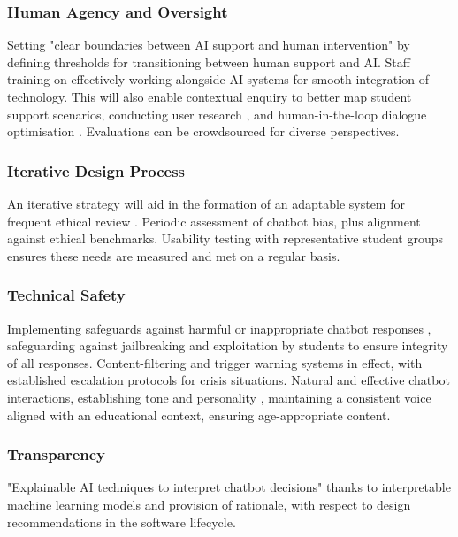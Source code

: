 \documentclass[14pt,a4paper]{article}
\begin{document}
\begin{multicols}{2}
\subsubsection{Human Agency and Oversight}

Setting "clear boundaries between AI support and human intervention" \textit{\parencite{APA2024}}by defining thresholds for transitioning between human support and AI. Staff training on effectively working alongside AI systems for smooth integration of technology. This will also enable contextual enquiry to better map student support scenarios, conducting user research \textit{\parencite[pp. 50-100]{Goodman2023}}, and human-in-the-loop dialogue optimisation \textit{\parencite[pp. 30-60]{Vaughan2024}}. Evaluations can be crowdsourced for diverse perspectives.

\subsubsection{Iterative Design Process}
An iterative strategy \textit{\parencite[pp. 30-60]{HoltzblattBeyer2024}} will aid in the formation of an adaptable system for frequent ethical review \textit{\parencite{FloridiCowls2023}}. Periodic assessment of chatbot bias, plus alignment against ethical benchmarks. Usability testing with representative student groups ensures these needs are measured and met on a regular basis.

\subsubsection{Technical Safety}
Implementing safeguards against harmful or inappropriate chatbot responses \textit{\parencite[p. e11510]{Bickmore2021}}, safeguarding against jailbreaking and exploitation by students to ensure integrity of all responses. Content-filtering and trigger warning systems in effect, with established escalation protocols for crisis situations. Natural and effective chatbot interactions, establishing tone and personality \textit{\parencite[pp. 20-50]{Bradbury2024}}, maintaining a consistent voice aligned with an educational context, ensuring age-appropriate content.

\subsubsection{Transparency}
 "Explainable AI techniques to interpret chatbot decisions" \textit{\parencite[pp. 82-115]{Arrieta2022}} thanks to interpretable machine learning models and provision of rationale, with respect to design recommendations in the software lifecycle.



\end{multicols}
\end{document}
